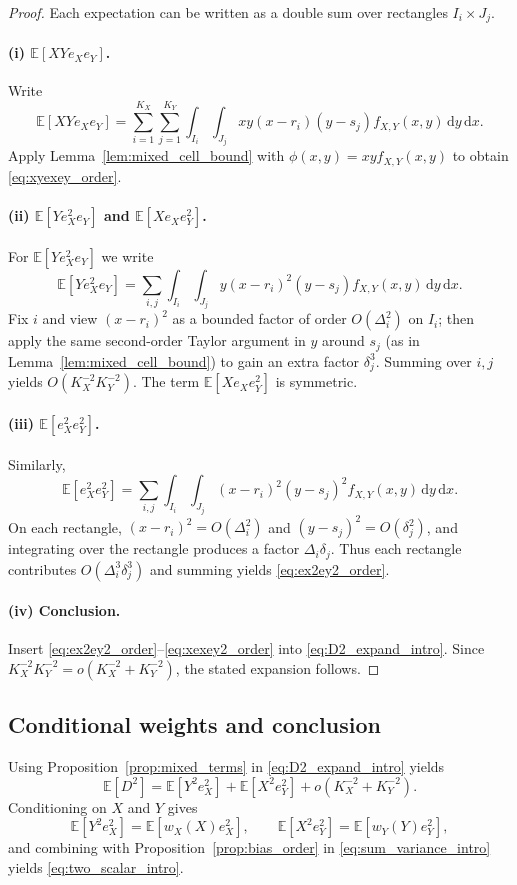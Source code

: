 \documentclass{article}
\newcommand{\E}{\mathbb{E}}
\newcommand{\dd}{\,\mathrm{d}}
\begin{document}
\begin{proof}
Each expectation can be written as a double sum over rectangles $I_i\times J_j$.

\paragraph*{(i) $\E[XYe_Xe_Y]$.}
Write
\[
\E[XYe_Xe_Y]=\sum_{i=1}^{K_X}\sum_{j=1}^{K_Y}\int_{I_i}\int_{J_j} x y (x-r_i)(y-s_j) f_{X,Y}(x,y)\dd y\dd x.
\]
Apply Lemma~\ref{lem:mixed_cell_bound} with $\phi(x,y)=xy f_{X,Y}(x,y)$ to obtain \eqref{eq:xyexey_order}.

\paragraph*{(ii) $\E[Ye_X^2e_Y]$ and $\E[Xe_Xe_Y^2]$.}
For $\E[Ye_X^2e_Y]$ we write
\[
\E[Ye_X^2e_Y]=\sum_{i,j}\int_{I_i}\int_{J_j} y(x-r_i)^2(y-s_j) f_{X,Y}(x,y)\dd y\dd x.
\]
Fix $i$ and view $(x-r_i)^2$ as a bounded factor of order $O(\Delta_i^2)$ on $I_i$; then apply the same second-order Taylor argument in $y$ around $s_j$ (as in Lemma~\ref{lem:mixed_cell_bound}) to gain an extra factor $\delta_j^3$. Summing over $i,j$ yields $O(K_X^{-2}K_Y^{-2})$. The term $\E[Xe_Xe_Y^2]$ is symmetric.

\paragraph*{(iii) $\E[e_X^2e_Y^2]$.}
Similarly,
\[
\E[e_X^2e_Y^2]=\sum_{i,j}\int_{I_i}\int_{J_j} (x-r_i)^2(y-s_j)^2 f_{X,Y}(x,y)\dd y\dd x.
\]
On each rectangle, $(x-r_i)^2=O(\Delta_i^2)$ and $(y-s_j)^2=O(\delta_j^2)$, and integrating over the rectangle produces a factor $\Delta_i\delta_j$. Thus each rectangle contributes $O(\Delta_i^3\delta_j^3)$ and summing yields \eqref{eq:ex2ey2_order}.

\paragraph*{(iv) Conclusion.}
Insert \eqref{eq:ex2ey2_order}--\eqref{eq:xexey2_order} into \eqref{eq:D2_expand_intro}. Since $K_X^{-2}K_Y^{-2}=o(K_X^{-2}+K_Y^{-2})$, the stated expansion follows.
\end{proof}

\subsection{Conditional weights and conclusion}
Using Proposition~\ref{prop:mixed_terms} in \eqref{eq:D2_expand_intro} yields
\[
\E[D^2]=\E[Y^2e_X^2]+\E[X^2e_Y^2]+o(K_X^{-2}+K_Y^{-2}).
\]
Conditioning on $X$ and $Y$ gives
\[
\E[Y^2e_X^2]=\E[w_X(X)e_X^2],\qquad \E[X^2e_Y^2]=\E[w_Y(Y)e_Y^2],
\]
and combining with Proposition~\ref{prop:bias_order} in \eqref{eq:sum_variance_intro} yields \eqref{eq:two_scalar_intro}.
\end{document}
